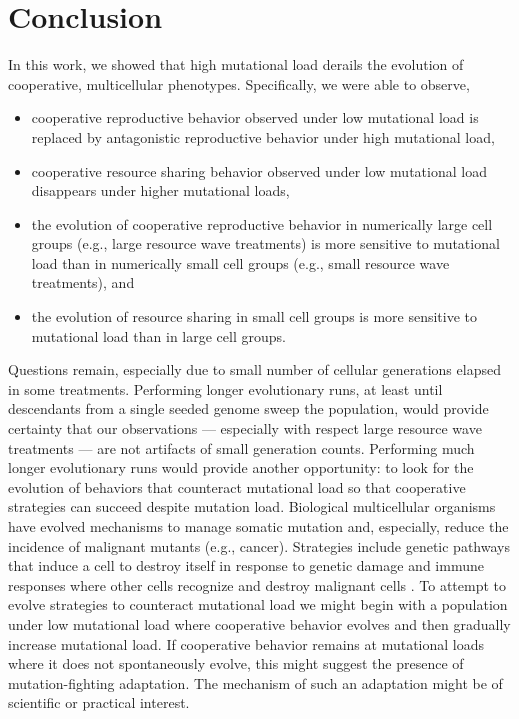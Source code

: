 \section{Conclusion}

In this work, we showed that high mutational load derails the evolution of cooperative, multicellular phenotypes.
Specifically, we were able to observe,
\begin{itemize}
\item cooperative reproductive behavior observed under low mutational load is replaced by antagonistic reproductive behavior under high mutational load,
\item cooperative resource sharing behavior observed under low mutational load disappears under higher mutational loads,
\item the evolution of cooperative reproductive behavior in numerically large cell groups (e.g., large resource wave treatments) is more sensitive to mutational load than in numerically small cell groups (e.g., small resource wave treatments), and
\item the evolution of resource sharing in small cell groups is more sensitive to mutational load than in large cell groups.
\end{itemize}

Questions remain, especially due to small number of cellular generations elapsed in some treatments.
Performing longer evolutionary runs, at least until descendants from a single seeded genome sweep the population, would provide certainty that our observations --- especially with respect large resource wave treatments --- are not artifacts of small generation counts.
Performing much longer evolutionary runs would provide another opportunity: to look for the evolution of behaviors that counteract mutational load so that cooperative strategies can succeed despite mutation load.
Biological multicellular organisms have evolved mechanisms to manage somatic mutation and, especially, reduce the incidence of malignant mutants (e.g., cancer).
Strategies include genetic pathways that induce a cell to destroy itself in response to genetic damage \citep{lee1995apoptosis} and immune responses where other cells recognize and destroy malignant cells \citep{Martinez-Lostao5047}.
To attempt to evolve strategies to counteract mutational load we might begin with a population under low mutational load where cooperative behavior evolves and then gradually increase mutational load.
If cooperative behavior remains at mutational loads where it does not spontaneously evolve, this might suggest the presence of mutation-fighting adaptation.
The mechanism of such an adaptation might be of scientific or practical interest.

